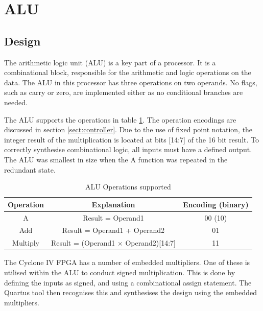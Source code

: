 

\section{ALU}

\subsection{Design}
The arithmetic logic unit (ALU) is a key part of a processor. 
It is a combinational block, responsible for the arithmetic and logic operations on the data.
The ALU in this processor has three operations on two operands.
No flags, such as carry or zero, are implemented either as no conditional branches are needed.

The ALU supports the operations in table \ref{tab:aluops}.
The operation encodings are discussed in section \ref{sect:controller}.
Due to the use of fixed point notation, the integer result of the multiplication is located at bits [14:7] of the 16 bit result.
To correctly synthesise combinational logic, all inputs must have a defined output.
The ALU was smallest in size when the A function was repeated in the redundant state.

\begin{table}
\caption{ALU Operations supported}
\label{tab:aluops}
\begin{tabular}{ccc} \toprule
Operation & Explanation & Encoding (binary)\\  \midrule
A & Result = Operand1 & 00 (10) \\
Add & Result = Operand1 + Operand2 & 01 \\
Multiply & Result = (Operand1 $\times$ Operand2)[14:7] & 11 \\ \bottomrule
\end{tabular}
\end{table}


The Cyclone IV FPGA has a number of embedded multipliers. 
One of these is utilised within the ALU to conduct signed multiplication. 
This is done by defining the inputs as signed, and using a combinational assign statement.
The Quartus tool then recognises this and synthesises the design using the embedded multipliers.



